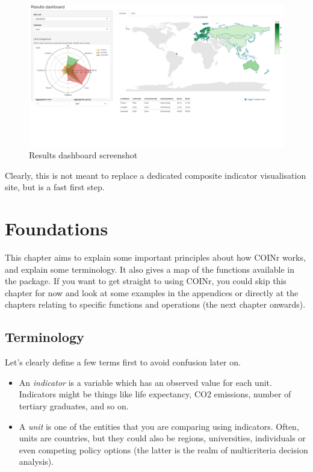 \documentclass[
]{book}
\begin{document}
\begin{figure}

{\centering \includegraphics[width=1\linewidth]{images/demo_resultsdash} 

}

\caption{Results dashboard screenshot}\label{fig:unnamed-chunk-4}
\end{figure}

Clearly, this is not meant to replace a dedicated composite indicator visualisation site, but is a fast first step.

\hypertarget{foundations}{%
\chapter{Foundations}\label{foundations}}

This chapter aims to explain some important principles about how COINr works, and explain some terminology. It also gives a map of the functions available in the package. If you want to get straight to using COINr, you could skip this chapter for now and look at some examples in the appendices or directly at the chapters relating to specific functions and operations (the next chapter onwards).

\hypertarget{terminology}{%
\section{Terminology}\label{terminology}}

Let's clearly define a few terms first to avoid confusion later on.

\begin{itemize}
\item
  An \emph{indicator} is a variable which has an observed value for each unit. Indicators might be things like life expectancy, CO2 emissions, number of tertiary graduates, and so on.
\item
  A \emph{unit} is one of the entities that you are comparing using indicators. Often, units are countries, but they could also be regions, universities, individuals or even competing policy options (the latter is the realm of multicriteria decision analysis).
\end{itemize}
\end{document}
